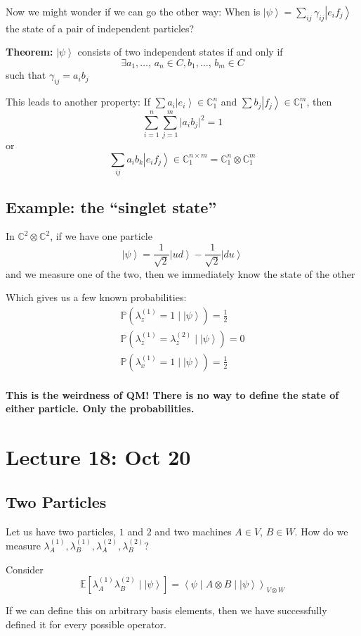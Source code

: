 \documentclass[12pt]{article}
\renewcommand{\P}{\mathbb{P}}
\newcommand{\brak}[1]{\left\langle #1 \right\rangle}
\newcommand{\C}{\mathbb{C}}
\newcommand{\ket}[1]{\left\vert #1 \right\rangle}
\newcommand{\E}{\mathbb{E}}
\begin{document}
Now we might wonder if we can go the other way: When is $\ket \psi = \sum_{ij} \gamma_{ij} \ket{e_i f_j}$ the state of a pair of independent particles? 

\textbf{Theorem:} $\ket \psi$ consists of two independent states if and only if 
\[\exists a_1, \dots,\, a_n \in C, b_1, \dots,\, b_m \in C\]
such that $\gamma_{ij} = a_i b_j$

This leads to another property: If $\sum a_i \ket{e_i} \in \C_1^n$ and $\sum b_j \ket{f_j} \in \C_1^m$, then  
    \[\sum_{i=1}^n \sum_{j=1}^m \big\vert a_i b_j \big\vert^2 = 1\] 
    or 
    \[\sum_{ij} a_ib_k \ket{e_i f_j} \in \C_1^{n\times m} = \C^n_1 \otimes \C^m_1\]

\subsection*{Example: the ``singlet state''}
In $\C^2 \otimes \C^2$, if we have one particle 
\[\ket \psi = \frac{1}{\sqrt 2} \ket{ud} - \frac{1}{\sqrt 2}\ket{du}\]
and we measure one of the two, then we immediately know the state of the other

Which gives us a few known probabilities:
\begin{align*}
    \P(\lambda_z^{(1)} = 1 \; | \; \ket \psi) = \frac{1}{2}\\
    \P(\lambda_z^{(1)} = \lambda_z^{(2)} \; | \; \ket \psi) = 0\\
    \P(\lambda_x^{(1)} = 1 \; | \; \ket \psi) = \frac{1}{2}\\
\end{align*}

\textbf{This is the weirdness of QM! There is no way to define the state of either particle. Only the probabilities.}

\section*{Lecture 18: Oct 20}
\subsection*{Two Particles}
Let us have two particles, $1$ and $2$ and two machines $A \in V$, $B \in W$. How do we measure $\lambda_A^{(1)}, \lambda_B^{(1)}, \lambda_A^{(2)}, \lambda_B^{(2)}$? 

Consider
\[\E[\lambda_A^{(1)}\lambda_B^{(2)} \; | \; \ket \psi] = \brak{\psi \; | \; A \otimes B \; | \; \ket \psi}_{V\otimes W}\]

If we can define this on arbitrary basis elements, then we have successfully defined it for every possible operator. 
\end{document}
